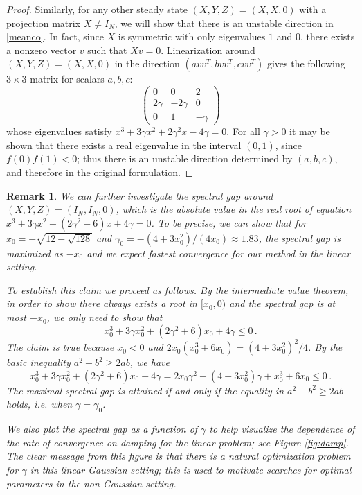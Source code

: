 \documentclass[12pt]{caltech_thesis}
\newtheorem{remark}[theorem]{Remark}
\numberwithin{equation}{section}
\begin{document}
{\begin{proof}
{Similarly, for any other steady state $(X,Y,Z)=(X,X,0)$ with a projection matrix $X\neq I_N$, we will show that there is an unstable direction in \eqref{meanco}. In fact, since $X$ is symmetric with only eigenvalues $1$ and $0$, there exists a nonzero vector $v$ such that $Xv=0$. Linearization around $(X,Y,Z)=(X,X,0)$ in the direction $(avv^T,bvv^T,cvv^T)$ gives the following $3\times3$ matrix for scalars $a,b,c$:
$$\begin{pmatrix}
0 & 0 & 2 \\
2\gamma  & -2\gamma  & 0 \\
0 & 1 & -\gamma
\end{pmatrix}$$
{whose eigenvalues satisfy $x^3+3\gamma x^2+2\gamma ^2x-4\gamma=0$. {For
all $\gamma>0$ it may be shown that there exists a real eigenvalue in the 
interval $(0,1)$, {since $f(0)f(1)<0$}; thus there is an unstable direction determined by $(a,b,c)$,} and therefore in the original formulation.}} 
\end{proof}
\begin{remark}
\label{optg}
{We can further investigate the spectral gap around $(X,Y,Z)=(I_N,I_N,0)$, which is the absolute value in the real root of equation $x^3+3\gamma x^2+(2\gamma ^2+6)x+4\gamma=0$.
To be precise, we can show that for $x_0=-\sqrt{12-\sqrt{128}}$ and $\gamma_0=-(4+3x_0^2)/(4x_0)\approx 1.83$, the spectral gap is maximized as $-x_0$ and we expect fastest convergence for our method in the linear setting.}

{To establish this claim we proceed as follows. By the intermediate value theorem, in order to show there always exists a root in $[x_0,0)$ and the spectral gap is at most $-x_0$, we only need to show that $$x_0^3+3\gamma x_0^2+(2\gamma ^2+6)x_0+4\gamma\leq0\,.$$  The claim is true because $x_0<0$ and $2x_0(x_0^3+6x_0)=(4+3x_0^2)^2/4$. By the basic inequality $a^2+b^2\geq 2ab$, we have  $$x_0^3+3\gamma x_0^2+(2\gamma ^2+6)x_0+4\gamma=2x_0\gamma^2+(4+3x_0^2)\gamma+x_0^3+6x_0\leq0\,.$$
The maximal spectral gap is attained if and only if the equality in $a^2+b^2\geq 2ab$ holds, i.e. when $\gamma=\gamma_0$.}

We also plot the spectral gap as a function of $\gamma$ to help visualize the dependence of the rate of convergence on damping for the linear problem; see Figure \ref{fig:damp}. {The clear message from this figure is that there is a natural
optimization problem for $\gamma$ in this linear Gaussian setting; this is used
to motivate searches for optimal parameters in the non-Gaussian setting.}


\end{remark}}
\end{document}
